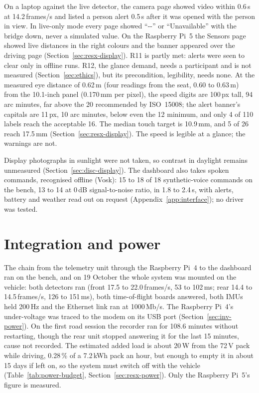 On a laptop against the live detector, the camera page showed video within 0.6\,s at 14.2\,frames/s and listed a person alert 0.5\,s after it was opened with the person in view. In live-only mode every page showed ``-{}-'' or ``Unavailable'' with the bridge down, never a simulated value. On the Raspberry Pi~5 the Sensors page showed live distances in the right colours and the banner appeared over the driving page (Section~\ref{sec:resx-display}). R11 is partly met: alerts were seen to clear only in offline runs. R12, the glance demand, needs a participant and is not measured (Section~\ref{sec:ethics}), but its precondition, legibility, needs none. At the measured eye distance of 0.62\,m (four readings from the seat, 0.60 to 0.63\,m) from the 10.1-inch panel (0.170\,mm per pixel), the speed digits are 100\,px tall, 94 arc minutes, far above the 20 recommended by ISO~15008; the alert banner's capitals are 11\,px, 10 arc minutes, below even the 12 minimum, and only 4 of 110 labels reach the acceptable 16. The median touch target is 10.9\,mm, and 5 of 26 reach 17.5\,mm (Section~\ref{sec:resx-display}). The speed is legible at a glance; the warnings are not.

Display photographs in sunlight were not taken, so contrast in daylight remains unmeasured (Section~\ref{sec:disc-display}). The dashboard also takes spoken commands, recognised offline (Vosk): 15 to 18 of 18 synthetic-voice commands on the bench, 13 to 14 at 0\,dB signal-to-noise ratio, in 1.8 to 2.4\,s, with alerts, battery and weather read out on request (Appendix~\ref{app:interface}); no driver was tested.

\section{Integration and power}
\label{sec:res-integration}

The chain from the telemetry unit through the Raspberry Pi~4 to the dashboard ran on the bench, and on 19 October the whole system was mounted on the vehicle: both detectors ran (front 17.5 to 22.0\,frames/s, 53 to 102\,ms; rear 14.4 to 14.5\,frames/s, 126 to 151\,ms), both time-of-flight boards answered, both IMUs held 200\,Hz and the Ethernet link ran at 1000\,Mb/s. The Raspberry Pi~4's under-voltage was traced to the modem on its USB port (Section~\ref{sec:inv-power}). On the first road session the recorder ran for 108.6 minutes without restarting, though the rear unit stopped answering it for the last 15 minutes, cause not recorded. The estimated added load is about 20\,W from the 72\,V pack while driving, 0.28\,\% of a 7.2\,kWh pack an hour, but enough to empty it in about 15 days if left on, so the system must switch off with the vehicle (Table~\ref{tab:power-budget}, Section~\ref{sec:resx-power}). Only the Raspberry Pi~5's figure is measured.

